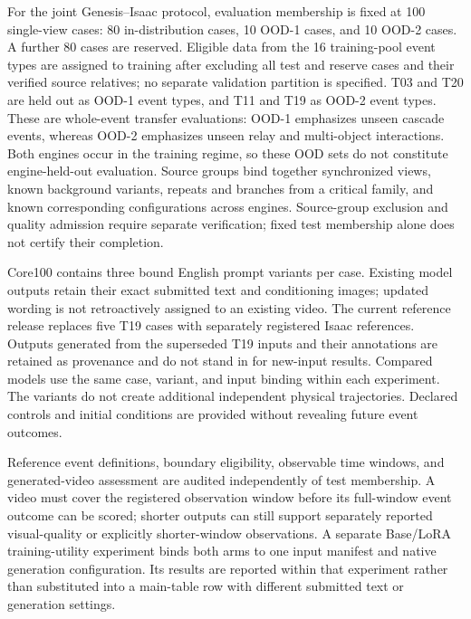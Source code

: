 For the joint Genesis--Isaac protocol, evaluation membership is fixed at
100 single-view cases: 80 in-distribution cases, 10 OOD-1 cases, and 10 OOD-2
cases. A further 80 cases are reserved. Eligible data from the 16
training-pool event types are assigned to training after excluding all test
and reserve cases and their verified source relatives; no separate
validation partition is specified.
T03 and T20 are held out as OOD-1 event types, and T11 and T19 as OOD-2 event
types. These are whole-event transfer evaluations: OOD-1 emphasizes unseen
cascade events, whereas OOD-2 emphasizes unseen relay and multi-object
interactions. Both engines occur in the training regime, so these OOD sets do
not constitute engine-held-out evaluation. Source groups bind together
synchronized views, known background variants, repeats and branches from a
critical family, and known corresponding configurations across engines.
Source-group exclusion and quality admission require separate verification;
fixed test membership alone does not certify their completion.

Core100 contains three bound English prompt variants per case. Existing
model outputs retain their exact submitted text and conditioning images;
updated wording is not retroactively assigned to an existing video. The
current reference release replaces five T19 cases with separately registered
Isaac references. Outputs generated from the superseded T19 inputs and their
annotations are retained as provenance and do not stand in for new-input
results. Compared models use the same case, variant, and input binding within
each experiment. The variants do not create additional independent physical
trajectories. Declared controls and initial conditions are provided without
revealing future event outcomes.

Reference event definitions, boundary eligibility, observable time windows,
and generated-video assessment are audited independently of test membership.
A video must cover the registered observation window before its full-window
event outcome can be scored; shorter outputs can still support separately
reported visual-quality or explicitly shorter-window observations. A
separate Base/LoRA training-utility experiment binds both arms to one input
manifest and native generation configuration. Its results are reported
within that experiment rather than substituted into a main-table row with
different submitted text or generation settings.


